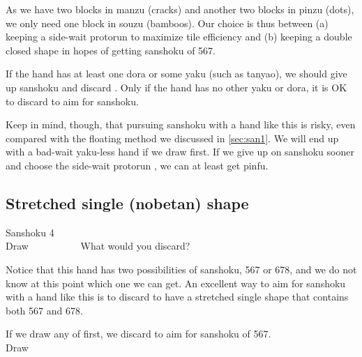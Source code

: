 \bigskip
As we have two blocks in {\jap manzu} (cracks) and another two blocks in {\jap pinzu} (dots), we only need one block in {\jap souzu} (bamboos). Our choice is thus between (a) keeping a side-wait protorun {\LARGE{}} to maximize tile efficiency and (b) keeping a double closed shape {\LARGE{}} in hopes of getting {\jap sanshoku} of 567. 

\bigskip
If the hand has at least one {\jap dora} or some {\jap yaku} (such as {\jap tanyao}), we should give up {\jap sanshoku} and discard {\LARGE{}}. Only if the hand has no other {\jap yaku} or {\jap dora}, it is OK to discard {\LARGE{}} to aim for {\jap sanshoku}. 

\bigskip
Keep in mind, though, that pursuing {\jap sanshoku} with a hand like this is risky, even compared with the floating method we discussed in \ref{sec:san1}. We will end up with a bad-wait {\jap yaku}-less hand if we draw {\LARGE{}} first. If we give up on {\jap sanshoku} sooner and choose the side-wait protorun {\LARGE{}}, we can at least get {\jap pinfu}. 

\bigskip
\subsection{Stretched single ({\jap nobetan}) shape}\label{sec:san4}
\begin{itembox}[r]{{\jap Sanshoku} 4}
\bp
{}~\\
\hfill\footnotesize{Draw~~~~~~~~~~}
\ep
\vspace{-17pt}What would you discard? \vspace{-5pt}
\end{itembox}

\bigskip
Notice that this hand has two possibilities of {\jap sanshoku}, 567 or 678, and we do not know at this point which one we can get. An excellent way to aim for {\jap sanshoku} with a hand like this is to discard {\LARGE{}} to have a stretched single shape {\LARGE{}} that contains both 567 and 678. 

\bigskip
If we draw any of {\LARGE{}} first, we discard {\LARGE{}} to aim for {\jap sanshoku} of 567. 
\bp
{}~\\
\hfill\footnotesize{Draw~~~~~~~~~~~~~~~}
\ep

